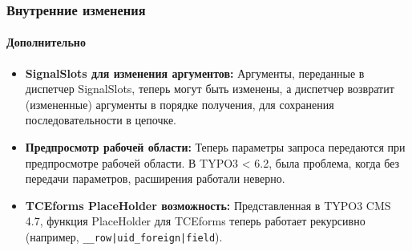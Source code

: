 \begin{frame}[fragile]
	\frametitle{Внутренние изменения}
	\framesubtitle{Дополнительно}

	\begin{itemize}

		\item \textbf{SignalSlots для изменения аргументов:}\newline
			\small
				Аргументы, переданные в диспетчер SignalSlots, теперь могут быть изменены, а диспетчер возвратит (измененные)
				аргументы в порядке получения, для сохранения последовательности в цепочке.
			\normalsize

		\item \textbf{Предпросмотр рабочей области:}\newline
			\small
				Теперь параметры запроса передаются при предпросмотре рабочей области. В TYPO3 < 6.2, была проблема, когда без передачи параметров, расширения работали неверно.
			\normalsize

		\item \textbf{TCEforms PlaceHolder возможность:}\newline
			\small
				Представленная в TYPO3 CMS 4.7, функция PlaceHolder для TCEforms теперь работает рекурсивно (например,
				\texttt{\_\_row|uid\_foreign|field}).
			\normalsize

	\end{itemize}
	
\end{frame}


